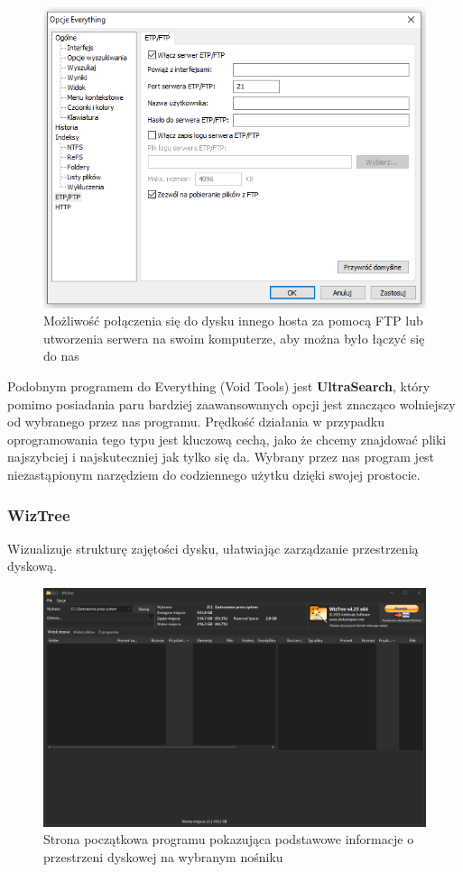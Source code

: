 \documentclass[0.82pt,a4paper]{article}
\begin{document}
    \begin{figure}[H]
        \centering
        \includegraphics[width=0.8\linewidth]{media/EverythingTool/ev7.PNG}
        \caption[everything ftp]{Możliwość połączenia się do dysku innego hosta za pomocą FTP lub utworzenia serwera na swoim komputerze, aby można było łączyć się do nas}
        \label{fig:ev_ftp}
    \end{figure}
    Podobnym programem do Everything (Void Tools) jest \textbf{UltraSearch}, który pomimo posiadania paru bardziej zaawansowanych opcji jest znacząco wolniejszy od wybranego przez nas programu. Prędkość działania w przypadku oprogramowania tego typu jest kluczową cechą, jako że chcemy znajdować pliki najszybciej i najskuteczniej jak tylko się da. Wybrany przez nas program jest niezastąpionym narzędziem do codziennego użytku dzięki swojej prostocie.
    
\subsubsection{WizTree}
    Wizualizuje strukturę zajętości dysku, ułatwiając zarządzanie przestrzenią dyskową.
    \begin{figure}[H]
        \centering
        \includegraphics[width=0.8\linewidth]{media/WizTree/wiz1.PNG}
        \caption[wiz glowne]{Strona początkowa programu pokazująca podstawowe informacje o przestrzeni dyskowej na wybranym nośniku}
        \label{fig:wiz_glowne}
    \end{figure}
\end{document}
